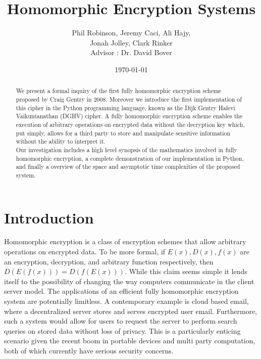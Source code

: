\documentclass[letterpaper,11pt]{article} %
\title{Homomorphic Encryption Systems}
\date{\today}
\author{
Phil Robinson, Jeremy Caci, Ali Hajy,\\
Jonah Jolley, Clark Rinker\\
Advisor : Dr. David Bover}
\begin{document}
\maketitle

\begin{abstract}
\hspace{1em}We present a formal inquiry of the first fully homomorphic encryption scheme proposed by Craig Gentry in 2008. Moreover we introduce the first implementation of this cipher in the Python programming language, known as the Dijk Gentry Halevi Vaikuntanathan (DGHV) cipher. A fully homomorphic encryption scheme enables the execution of arbitrary operations on encrypted data without the decryption key which, put simply, allows for a third party to  store and manipulate sensitive information without the ability to interpret it.\\ 

\hspace{1em}Our investigation includes a high level synopsis of the mathematics involved in fully homomorphic encryption, a complete demonstration of our implementation in Python, and finally a overview of the space and asymptotic time complexities of the proposed system. 
\end{abstract}


\section*{Introduction}

	Homomorphic encryption is a class of encryption schemes that allow arbitrary operations on encrypted data. To be more formal, if $E(x),D(x),f(x)$ are an encryption, decryption, and arbitrary function respectively, then $D(E(f(x)))=D(f(E(x)))$. While this claim seems simple it lends itself to the possibility of changing the way computers communicate in the client server model. The applications of an efficient fully homomorphic encryption system are potentially limitless. A contemporary example is cloud based email, where a decentralized server stores and serves encrypted user email. Furthermore, such a system would allow for users to request the server to perform search queries on stored data without loss of privacy. This is a particularly enticing scenario given the recent boom in portable devices and multi party computation, both of which currently have serious security concerns. \\
\end{document}
